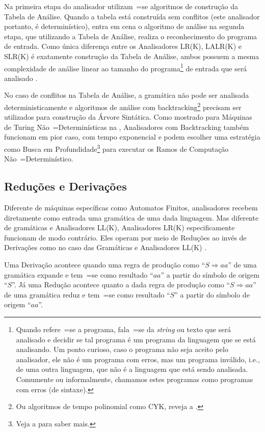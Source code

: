 Na primeira etapa do analisador utilizam~=se algoritmos de construção da Tabela de Análise.
Quando a tabela está construída sem conflitos (este analisador portanto,
é determinístico),
entra em cena o algoritmo de análise na segunda etapa,
que utilizando a Tabela de Análise,
realiza o reconhecimento do programa de entrada.
Como única diferença entre os Analisadores LR(K),
LALR(K) e
SLR(K) é exatamente construção da Tabela de Análise,
ambos possuem a mesma complexidade de análise linear ao tamanho do programa\footnote{
Quando refere~=se a programa,
fala~=se da \textit{string} ou
texto que será analisado e
decidir se tal programa é um programa da linguagem que se está analisando.
Um ponto curioso,
caso o programa não seja aceito pelo analisador,
ele não é um programa com erros,
mas um programa inválido,
i.e.,
de uma outra linguagem,
que não é a linguagem que está sendo analisada.
Comumente ou
informalmente,
chamamos estes programas como programas com erros (de sintaxe).
}
de entrada que será analisado \cite{knuthLrParser1965,linearLL1AndLR1Grammars,generalContextFreeParsingAlgorithm}.

No caso de conflitos na Tabela de Análise,
a gramática não pode ser analisada deterministicamente e
algoritmos de análise com backtracking\footnote{
Ou algoritmos de tempo polinomial como CYK,
reveja a .
}
precisam ser utilizados para construção da Árvore Sintática.
Como mostrado para Máquinas de Turing Não~=Determinísticas na ,
Analisadores com Backtracking também funcionam em pior caso,
com tempo exponencial e
podem escolher uma estratégia como Busca em Profundidade\footnote{
Veja a  para saber mais.
} para executar os Ramos de Computação Não~=Determinístico.


\subsection{Reduções e Derivações}
\label{reducoesEderivacoes}

Diferente de máquinas específicas como Automatos Finitos,
analisadores recebem diretamente como entrada uma gramática de uma dada linguagem.
Mas diferente de gramáticas e
Analisadores LL(K),
Analisadores LR(K) especificamente funcionam de modo contrário.
Eles operam por meio de Reduções ao invés de Derivações como no caso das Gramáticas e
Analisadores LL(K) \cite{ahoCompilerDragonBook}.

Uma Derivação acontece quando uma regra de produção como ``$S \Rightarrow a a $'' de uma gramática expande e
tem~=se como resultado ``$a a$'' a partir do símbolo de origem ``$S$''.
Já uma Redução acontece quanto a dada regra de produção como ``$S \Rightarrow a a $'' de uma gramática reduz e
tem~=se como resultado ``$S$'' a partir do símbolo de origem ``$a a$''.

